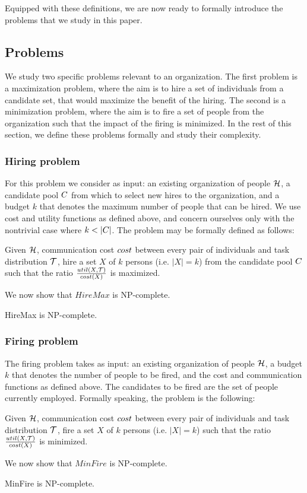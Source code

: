 Equipped with these definitions, we are now ready to formally introduce the problems that we study in this paper.

\subsection{Problems}


We study two specific problems relevant to an organization.
The first problem is a maximization problem, where the aim is to hire a set of individuals from a candidate set, that would maximize the benefit of the hiring.
The second is a minimization problem, where the aim is to fire a set of people from the organization such that the impact of the firing is minimized.
In the rest of this section, we define these problems formally and study their complexity.

\subsubsection{Hiring problem}

For this problem we consider as input: an existing organization of people $\mathcal{H}$, a candidate pool ${C}$ from which to select new hires to the organization, and a budget $k$ that denotes the maximum number of people that can be hired.
We use cost and utility functions as defined above, and concern ourselves only with the nontrivial case where $k < |{C}|$.
The problem may be formally defined as follows:
\begin{problem}
[HireMax] Given $\mathcal{H}$, communication cost $cost$ between every pair of individuals and task distribution $\mathcal{T}$, hire a set $X$ of $k$ persons (i.e. $|X| = k$) from the candidate pool ${C}$ such that the ratio $\frac{{util}(X, \mathcal{T})}{cost(X)}$ is maximized.
\end{problem}

We now show that $HireMax$ is NP-complete.
\begin{theorem}
HireMax is NP-complete.
\end{theorem}

\subsubsection{Firing problem}

The firing problem takes as input: an existing organization of people $\mathcal{H}$, a budget $k$ that denotes the number of people to be fired, and the cost and communication functions as defined above. 
The candidates to be fired are the set of people currently employed. 
Formally speaking, the problem is the following:
\begin{problem}
[MinFire] Given $\mathcal{H}$, communication cost $cost$ between every pair of individuals and task distribution $\mathcal{T}$, fire a set $X$ of $k$ persons (i.e. $|X| = k$) such that the ratio $\frac{{util}(X, \mathcal{T})}{cost(X)}$ is minimized.
\end{problem}

We now show that $MinFire$ is NP-complete.
\begin{theorem}
MinFire is NP-complete.
\end{theorem}
